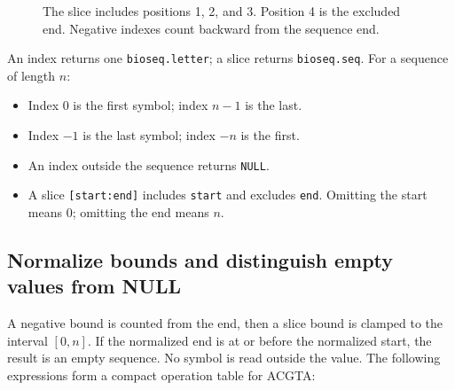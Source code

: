 \begin{figure}[htbp]
\centering
{}
\caption{The slice includes positions 1, 2, and 3. Position 4 is the
excluded end. Negative indexes count backward from the sequence end.}
\label{fig:appendix-slice-positions}
\end{figure}

An index returns one \texttt{bioseq.letter}; a slice returns
\texttt{bioseq.seq}. For a sequence of length $n$:
\begin{itemize}
  \item Index 0 is the first symbol; index $n-1$ is the last.
  \item Index $-1$ is the last symbol; index $-n$ is the first.
  \item An index outside the sequence returns \texttt{NULL}.
  \item A slice \texttt{[start:end]} includes \texttt{start} and excludes
    \texttt{end}. Omitting the start means 0; omitting the end means $n$.
\end{itemize}

\subsection{Normalize bounds and distinguish empty values from NULL}

A negative bound is counted from the end, then a slice bound is clamped to
the interval $[0,n]$. If the normalized end is at or before the normalized
start, the result is an empty sequence. No symbol is read outside the value.
The following expressions form a compact operation table for ACGTA:

